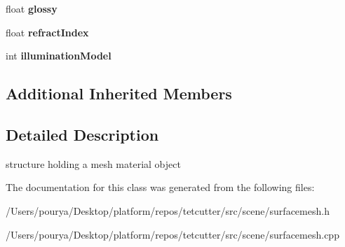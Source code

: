 \begin{DoxyCompactItemize}
\item 
\hypertarget{classps_1_1scene_1_1MeshMaterial_a65476012eb335f2fe6b1edc53c32cfec}{}float {\bfseries glossy}\label{classps_1_1scene_1_1MeshMaterial_a65476012eb335f2fe6b1edc53c32cfec}

\item 
\hypertarget{classps_1_1scene_1_1MeshMaterial_a7bcc08f3b02f6e00e975590aa871fb6b}{}float {\bfseries refract\+Index}\label{classps_1_1scene_1_1MeshMaterial_a7bcc08f3b02f6e00e975590aa871fb6b}

\item 
\hypertarget{classps_1_1scene_1_1MeshMaterial_a7d9a56ac3322d7ce53c22b13b1724169}{}int {\bfseries illumination\+Model}\label{classps_1_1scene_1_1MeshMaterial_a7d9a56ac3322d7ce53c22b13b1724169}

\end{DoxyCompactItemize}
\subsection*{Additional Inherited Members}


\subsection{Detailed Description}
structure holding a mesh material object 

The documentation for this class was generated from the following files\+:\begin{DoxyCompactItemize}
\item 
/\+Users/pourya/\+Desktop/platform/repos/tetcutter/src/scene/surfacemesh.\+h\item 
/\+Users/pourya/\+Desktop/platform/repos/tetcutter/src/scene/surfacemesh.\+cpp\end{DoxyCompactItemize}
